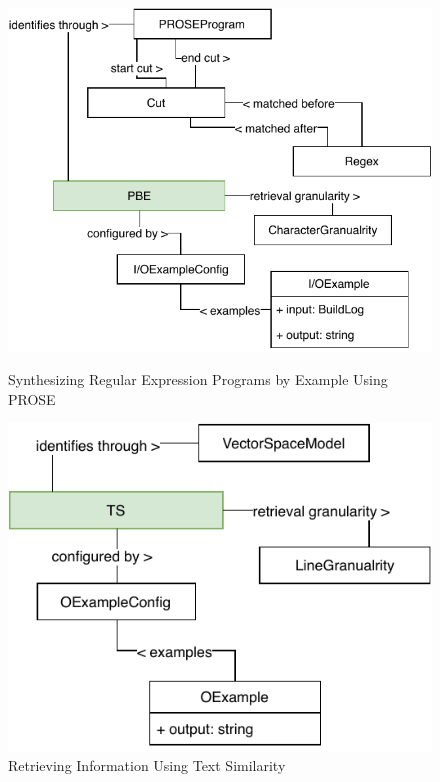 \documentclass[\myrootdir/main.tex]{subfiles}
\begin{document}
\begin{figure}[hp]
	\centering
	\begin{minipage}{0.45\textwidth}
		\centering
		\includegraphics[width=\textwidth, clip]{img/pbe-technique.pdf}
		\caption{Synthesizing Regular Expression Programs by Example Using PROSE}
		\label{fig:prose-explanation}
	\end{minipage}\hfill
	\begin{minipage}{0.45\textwidth}
		\centering
		\includegraphics[width=\textwidth, clip]{img/ts-technique.pdf}
		\caption{Retrieving Information Using Text Similarity}
		\label{fig:text-similarity-explanation}
	\end{minipage}
\end{figure}
\end{document}
